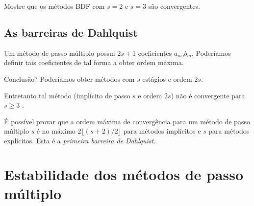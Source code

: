 \begin{exer}
Mostre que os métodos BDF com $s=2$ e $s=3$ são convergentes.
\end{exer}



\subsection{As barreiras de Dahlquist}
Um método de passo múltiplo possui $2s+1$ coeficientes $a_m$,$b_m$. Poderíamos definir tais coeficientes de tal forma a obter ordem máxima.

Conclusão? Poderíamos obter métodos com $s$ estágios e ordem $2s$.

Entretanto tal método (implícito de passo $s$ e ordem $2s$) não é convergente para $s\geq 3$ .

É possível provar que a ordem máxima de convergência para um método de passo múltiplo $s$ é no máximo  $2\lfloor(s+2)/2\rfloor$ para métodos implícitos e $s$ para métodos explícitos. Esta é a \emph{primeira barreira de Dahlquist}.

\section{Estabilidade dos métodos de passo múltiplo}


